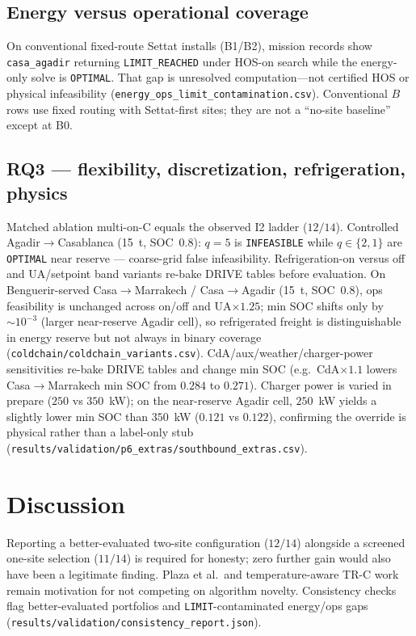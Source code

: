 \documentclass[review,12pt]{elsarticle}
\begin{document}
\subsection{Energy versus operational coverage}
On conventional fixed-route Settat installs (B1/B2), mission records show \texttt{casa\_agadir} returning \texttt{LIMIT\_REACHED} under HOS-on search while the energy-only solve is \texttt{OPTIMAL}.
That gap is unresolved computation---not certified HOS or physical infeasibility
(\texttt{energy\_ops\_limit\_contamination.csv}).
Conventional $B$ rows use fixed routing with Settat-first sites; they are not a ``no-site baseline'' except at B0.

\subsection{RQ3 --- flexibility, discretization, refrigeration, physics}
Matched ablation multi-on-C equals the observed I2 ladder ($12/14$).
Controlled Agadir$\rightarrow$Casablanca (15~t, SOC~$0.8$): $q{=}5$ is \texttt{INFEASIBLE} while $q\in\{2,1\}$ are \texttt{OPTIMAL} near reserve --- coarse-grid false infeasibility.
Refrigeration-on versus off and UA/setpoint band variants re-bake DRIVE tables before evaluation.
On Benguerir-served Casa$\rightarrow$Marrakech / Casa$\rightarrow$Agadir (15~t, SOC~$0.8$), ops feasibility is unchanged across on/off and UA$\times 1.25$;
min SOC shifts only by $\sim 10^{-3}$ (larger near-reserve Agadir cell), so refrigerated freight is distinguishable in energy reserve but not always in binary coverage
(\texttt{coldchain/coldchain\_variants.csv}).
CdA/aux/weather/charger-power sensitivities re-bake DRIVE tables and change min SOC
(e.g.\ CdA$\times 1.1$ lowers Casa$\rightarrow$Marrakech min SOC from $0.284$ to $0.271$).
Charger power is varied in prepare ($250$ vs $350$~kW); on the near-reserve Agadir cell, $250$~kW yields a slightly lower min SOC than $350$~kW ($0.121$ vs $0.122$), confirming the override is physical rather than a label-only stub
(\texttt{results/validation/p6\_extras/southbound\_extras.csv}).

\section{Discussion}
\label{sec:disc}
Reporting a better-evaluated two-site configuration ($12/14$) alongside a screened one-site selection ($11/14$) is required for honesty; zero further gain would also have been a legitimate finding.
Plaza et al.\ and temperature-aware TR-C work~\cite{VidottePlaza2026TRC,Cheng2026TemperatureAware} remain motivation for not competing on algorithm novelty.
Consistency checks flag better-evaluated portfolios and \texttt{LIMIT}-contaminated energy/ops gaps
(\texttt{results/validation/consistency\_report.json}).
\end{document}
